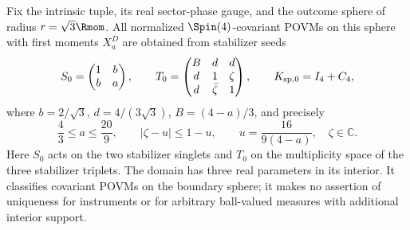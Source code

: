 \documentclass[11pt,a4paper]{article}
\begin{document}
\begin{theorem}
\label{p2c:thm:complete-intrinsic-endpoint-seeds}
Fix the intrinsic tuple, its real sector-phase gauge, and the outcome sphere
of radius $r=\sqrt3\Rmom$.  All normalized $\Spin(4)$-covariant POVMs on
this sphere with first moments $X_a^D$ are obtained from stabilizer seeds
\[
 S_0=\begin{pmatrix}1&b\\b&a\end{pmatrix},\qquad
 T_0=\begin{pmatrix}B&d&d\\d&1&\zeta\\d&\bar\zeta&1\end{pmatrix},
 \qquad K_{{\rm sp},0}=I_4+C_4,
\]
where $b=2/\sqrt3$, $d=4/(3\sqrt3)$, $B=(4-a)/3$, and precisely
\[
 \boxed{\frac43\le a\le\frac{20}{9},\qquad
         |\zeta-u|\le1-u,\qquad
         u=\frac{16}{9(4-a)},\quad\zeta\in\mathbb C.}
\]
Here $S_0$ acts on the two stabilizer singlets and $T_0$ on the multiplicity
space of the three stabilizer triplets.  The domain has three real
parameters in its interior.  It classifies covariant POVMs on the boundary
sphere; it makes no assertion of uniqueness for instruments or for arbitrary
ball-valued measures with additional interior support.
\end{theorem}
\end{document}
